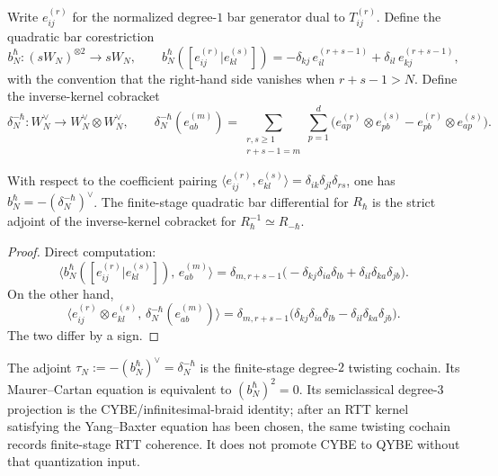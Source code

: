 Write $e_{ij}^{(r)}$ for the normalized degree-$1$ bar generator
dual to $T_{ij}^{(r)}$. Define the quadratic bar corestriction
\[
b_N^\hbar \colon (sW_N)^{\otimes 2} \to sW_N, \qquad
b_N^\hbar([e_{ij}^{(r)} | e_{kl}^{(s)}])
= -\delta_{kj}\,e_{il}^{(r+s-1)} + \delta_{il}\,e_{kj}^{(r+s-1)},
\]
with the convention that the right-hand side vanishes when
$r + s - 1 > N$. Define the inverse-kernel cobracket
\[
\delta_N^{-\hbar} \colon W_N^\vee \to W_N^\vee \otimes W_N^\vee,
\qquad
\delta_N^{-\hbar}(e_{ab}^{(m)})
= \sum_{\substack{r,s \ge 1 \\ r+s-1=m}} \sum_{p=1}^{d}
\bigl(e_{ap}^{(r)} \otimes e_{pb}^{(s)}
 - e_{pb}^{(r)} \otimes e_{ap}^{(s)}\bigr).
\]

\begin{theorem}
\label{thm:shifted-rtt-bar-adjointness}
With respect to the coefficient pairing
$\langle e_{ij}^{(r)}, e_{kl}^{(s)} \rangle
= \delta_{ik}\delta_{jl}\delta_{rs}$,
one has $b_N^\hbar = -(\delta_N^{-\hbar})^\vee$.
The finite-stage quadratic bar differential for $R_\hbar$ is the
strict adjoint of the inverse-kernel cobracket for
$R_\hbar^{-1} \simeq R_{-\hbar}$.
\end{theorem}

\begin{proof}
Direct computation:
\[
\bigl\langle b_N^\hbar([e_{ij}^{(r)}|e_{kl}^{(s)}]),\,
 e_{ab}^{(m)}\bigr\rangle
= \delta_{m,r+s-1}
 \bigl(-\delta_{kj}\delta_{ia}\delta_{lb}
 + \delta_{il}\delta_{ka}\delta_{jb}\bigr).
\]
On the other hand,
\[
\bigl\langle e_{ij}^{(r)} \otimes e_{kl}^{(s)},\,
 \delta_N^{-\hbar}(e_{ab}^{(m)})\bigr\rangle
= \delta_{m,r+s-1}
 \bigl(\delta_{kj}\delta_{ia}\delta_{lb}
 - \delta_{il}\delta_{ka}\delta_{jb}\bigr).
\]
The two differ by a sign.
\end{proof}

\begin{corollary}
\label{cor:shifted-rtt-twisting-cochain}
The adjoint $\tau_N := -(b_N^\hbar)^\vee = \delta_N^{-\hbar}$
is the finite-stage degree-$2$ twisting cochain. Its
Maurer--Cartan equation is equivalent to
$(b_N^\hbar)^2 = 0$. Its semiclassical degree-$3$ projection is the
CYBE/infinitesimal-braid identity; after an RTT kernel satisfying the
Yang--Baxter equation has been chosen, the same twisting cochain records
finite-stage RTT coherence. It does not promote CYBE to QYBE without
that quantization input.
\end{corollary}


